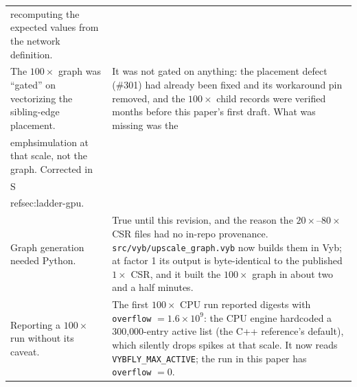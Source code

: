 \documentclass[11pt,a4paper]{article}
\newcommand{\code}[1]{\texttt{\footnotesize #1}}
\begin{document}
\begin{table}[h]
\begin{tabular}{p{5.3cm} p{9.7cm}}
recomputing the expected values from the network definition. \\
The $100\times$ graph was ``gated'' on vectorizing the sibling-edge placement. &
It was not gated on anything: the placement defect (\#301) had already been fixed and its
workaround pin removed, and the $100\times$ child records were verified months before this
paper's first draft. What was missing was the \\emph{simulation} at that scale, not the graph.
Corrected in \\S\\ref{sec:ladder-gpu}. \\
Graph generation needed Python. &
True until this revision, and the reason the $20\times$--$80\times$ CSR files had no in-repo
provenance. \code{src/vyb/upscale\_graph.vyb} now builds them in Vyb; at factor 1 its output is
byte-identical to the published $1\times$ CSR, and it built the $100\times$ graph in about two
and a half minutes. \\
Reporting a $100\times$ run without its caveat. &
The first $100\times$ CPU run reported digests with \code{overflow} $=1.6\times10^{9}$: the CPU
engine hardcoded a 300{,}000-entry active list (the C++ reference's default), which silently drops
spikes at that scale. It now reads \code{VYBFLY\_MAX\_ACTIVE}; the run in this paper has
\code{overflow} $=0$. \\
\bottomrule
\end{tabular}
\end{table}
\end{document}
